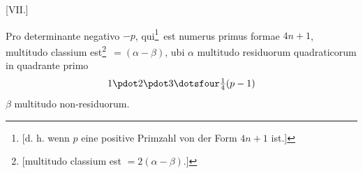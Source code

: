 \par\bigskip{}\centerline{[VII.]}\medskip
Pro determinante negativo $-p$, qui\begingroup\renewcommand{\thefootnote}{***)}\footnote{[d. h. wenn $p$ eine positive Primzahl von der Form $4n+1$ ist.]}\endgroup\ est numerus primus formae $4n+1$, multitudo classium est\begingroup\renewcommand{\thefootnote}{$\dagger$)}\footnote{[multitudo classium est $=2(\alpha-\beta)$.]}\endgroup\ $=(\alpha-\beta)$, ubi $\alpha$ multitudo residuorum quadraticorum in quadrante primo
\[
1\pdot2\pdot3\dotsfour\tfrac14(p-1)
\]
$\beta$ multitudo non-residuorum.
